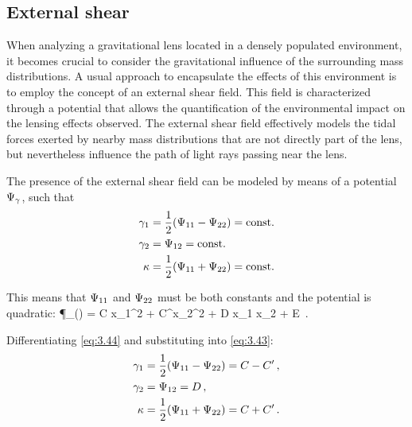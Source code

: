 \subsection{External shear}
\label{subsec:ext_shear}
When analyzing a gravitational lens located in a densely populated environment, it becomes crucial to consider the gravitational influence of the surrounding mass distributions. A usual approach to encapsulate the effects of this environment is to employ the concept of an external shear field. This field is characterized through a potential that allows the quantification of the environmental impact on the lensing effects observed. The external shear field effectively models the tidal forces exerted by nearby mass distributions that are not directly part of the lens, but nevertheless influence the path of light rays passing near the lens.

The presence of the external shear field can be modeled by means of a potential $\P_\g$, such that
\begin{equation}
\begin{aligned}
    \label{eq:3.43}
    \g_1 & = \frac{1}{2} (\P_{11} - \P_{22}) = \mathrm{const.}
    \\
    \g_2 & = \P_{12} = \mathrm{const.}
    \\
    \k & = \frac{1}{2} (\P_{11} + \P_{22}) = \mathrm{const.}
\end{aligned}
\end{equation}

This means that $\P_{11}$ and $\P_{22}$ must be both constants and the potential is quadratic:
\be
\label{eq:3.44}
\P_\g () = C x_1^2 + C^\prime x_2^2 + D x_1 x_2 + E \,.
\ee

Differentiating \cref{eq:3.44} and substituting into \cref{eq:3.43}:
\begin{equation}
\begin{aligned}
    \label{eq:3.45}
    \g_1 & = \frac{1}{2} (\P_{11} - \P_{22}) = C - C^\prime \,,
    \\
    \g_2 & = \P_{12} = D \,,
    \\
    \k & = \frac{1}{2} (\P_{11} + \P_{22}) = C + C^\prime \,.
\end{aligned}
\end{equation}

